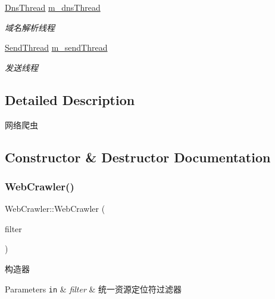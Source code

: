 \begin{DoxyCompactItemize}
\mbox{\label{class_web_crawler_ada21f95fb073ea1f81c8c7853ace9c6e}} 
\hyperlink{class_dns_thread}{Dns\+Thread} \hyperlink{class_web_crawler_ada21f95fb073ea1f81c8c7853ace9c6e}{m\+\_\+dns\+Thread}
\begin{DoxyCompactList}\small\item\em 域名解析线程 \end{DoxyCompactList}\item 
\mbox{\label{class_web_crawler_ae5098d623339f79eaaf7dd5b69d64a60}} 
\hyperlink{class_send_thread}{Send\+Thread} \hyperlink{class_web_crawler_ae5098d623339f79eaaf7dd5b69d64a60}{m\+\_\+send\+Thread}
\begin{DoxyCompactList}\small\item\em 发送线程 \end{DoxyCompactList}\end{DoxyCompactItemize}


\subsection{Detailed Description}
网络爬虫 

\subsection{Constructor \& Destructor Documentation}
\mbox{\label{class_web_crawler_ad8120b764c991bbf51764d47ea097b88}} 
\subsubsection{\texorpdfstring{Web\+Crawler()}{WebCrawler()}}
{\footnotesize\ttfamily Web\+Crawler\+::\+Web\+Crawler (\begin{DoxyParamCaption}\item[{\hyperlink{class_url_filter}{Url\+Filter} \&}]{filter }\end{DoxyParamCaption})}



构造器 


\begin{DoxyParams}[1]{Parameters}
\mbox{\tt in}  & {\em filter} & 统一资源定位符过滤器 \\
\hline
\end{DoxyParams}



